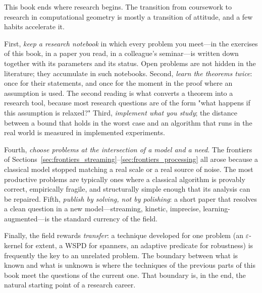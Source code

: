 This book ends where research begins. The transition
from coursework to research in computational geometry is mostly a transition
of attitude, and a few habits accelerate it.

First, \emph{keep a research notebook} in which every problem you meet---in
the exercises of this book, in a paper you read, in a colleague's
seminar---is written down together with its parameters and its status. Open
problems are not hidden in the literature; they accumulate in such notebooks.
Second, \emph{learn the theorems twice}: once for their statements, and once
for the moment in the proof where an assumption is used. The second reading is
what converts a theorem into a research tool, because most research questions
are of the form "what happens if this assumption is relaxed?" Third,
\emph{implement what you study}; the distance between a bound that holds in the
worst case and an algorithm that runs in the real world is measured in
implemented experiments.

Fourth, \emph{choose problems at the intersection of a model and a need}. The
frontiers of Sections~\ref{sec:frontiers_streaming}--\ref{sec:frontiers_processing}
all arose because a classical model stopped matching a real scale or a real
source of noise. The most productive problems are typically ones where a
classical algorithm is provably correct, empirically fragile, and structurally
simple enough that its analysis can be repaired. Fifth, \emph{publish by
solving, not by polishing}: a short paper that resolves a clean question in a
new model---streaming, kinetic, imprecise, learning-augmented---is the standard
currency of the field.

Finally, the field rewards \emph{transfer}: a technique developed for one
problem (an $\varepsilon$-kernel for extent, a WSPD for spanners, an adaptive
predicate for robustness) is frequently the key to an unrelated problem. The
boundary between what is known and what is unknown is where the techniques of
the previous parts of this book meet the questions of the current one. That
boundary is, in the end, the natural starting point of a research career.
